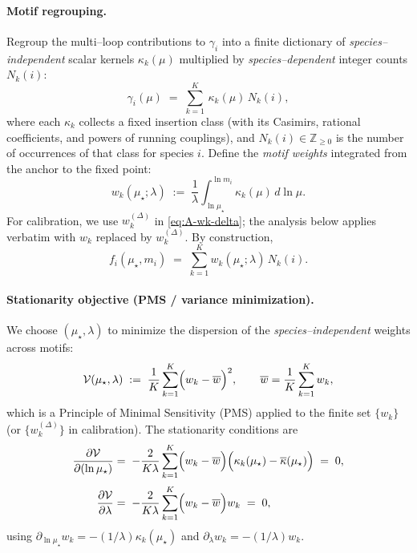 \documentclass[epjc3]{svjour3}
\begin{document}
\paragraph{Motif regrouping.}
Regroup the multi--loop contributions to $\gamma_i$ into a finite dictionary of \emph{species--independent} scalar kernels $\kappa_k(\mu)$ multiplied by \emph{species--dependent} integer counts $N_k(i)$:
\begin{equation}
  \gamma_i(\mu) \;=\; \sum_{k=1}^{K}\,\kappa_k(\mu)\,N_k(i),
  \label{eq:A-motif}
\end{equation}
where each $\kappa_k$ collects a fixed insertion class (with its Casimirs, rational coefficients, and powers of running couplings), and $N_k(i)\in\mathbb Z_{\ge 0}$ is the number of occurrences of that class for species $i$.
Define the \emph{motif weights} integrated from the anchor to the fixed point:
\begin{equation}
  w_k(\mu_\star;\lambda)\;:=\;\frac{1}{\lambda}\int_{\ln\mu_\star}^{\ln m_i}\kappa_k(\mu)\,d\ln\mu.
  \label{eq:A-wk}
\end{equation}
For calibration, we use \(w_k^{(\Delta)}\) in \eqref{eq:A-wk-delta}; the analysis below applies verbatim with \(w_k\) replaced by \(w_k^{(\Delta)}\). By construction,
\begin{equation}
  f_i(\mu_\star,m_i)\;=\;\sum_{k=1}^K w_k(\mu_\star;\lambda)\,N_k(i).
  \label{eq:A-res-vs-w}
\end{equation}

\paragraph{Stationarity objective (PMS / variance minimization).}
We choose $(\mu_\star,\lambda)$ to minimize the dispersion of the \emph{species--independent} weights across motifs:
\begin{equation}
  \mathcal V(\mu_\star,\lambda)\;:=\;\frac{1}{K}\sum_{k=1}^K\Bigl(w_k-\overline{w}\Bigr)^2,
  \qquad
  \overline{w}=\frac{1}{K}\sum_{k=1}^K w_k,
  \label{eq:A-var}
\end{equation}
which is a Principle of Minimal Sensitivity (PMS) applied to the finite set $\{w_k\}$ (or $\{w_k^{(\Delta)}\}$ in calibration).
The stationarity conditions are
\begin{align}
  \frac{\partial\mathcal V}{\partial(\ln\mu_\star)}&=\;-\frac{2}{K\lambda}\sum_{k=1}^K\Bigl(w_k-\overline{w}\Bigr)\Bigl(\kappa_k(\mu_\star)-\overline{\kappa}(\mu_\star)\Bigr)\;=\;0,
  \label{eq:A-stat-mu}\\[2pt]
  \frac{\partial\mathcal V}{\partial\lambda}&=\;-\frac{2}{K\lambda}\sum_{k=1}^K\Bigl(w_k-\overline{w}\Bigr)w_k\;=\;0,
  \label{eq:A-stat-lam}
\end{align}
using $\partial_{\ln\mu_\star}w_k=-(1/\lambda)\kappa_k(\mu_\star)$ and $\partial_\lambda w_k=-(1/\lambda)w_k$.
\end{document}

